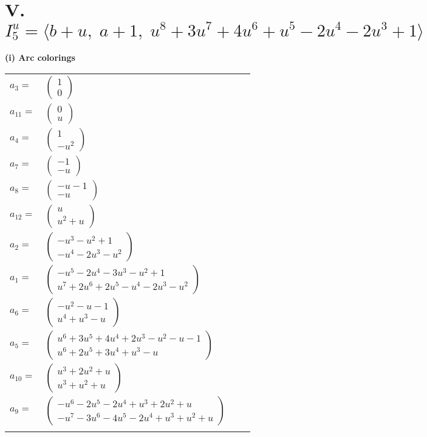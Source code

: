 \documentclass[1p]{elsarticle_modified}
\theoremstyle{definition}
\begin{document}
\centering \section*{V. $I^u_{5}= \langle b+u,\;a+1,\;u^8+3 u^7+4 u^6+u^5-2 u^4-2 u^3+1 \rangle$}
\flushleft \textbf{(i) Arc colorings}\\
\begin{tabular}{m{7pt} m{180pt} m{7pt} m{180pt} }
\flushright $a_{3}=$&$\begin{pmatrix}1\\0\end{pmatrix}$ \\
\flushright $a_{11}=$&$\begin{pmatrix}0\\u\end{pmatrix}$ \\
\flushright $a_{4}=$&$\begin{pmatrix}1\\- u^2\end{pmatrix}$ \\
\flushright $a_{7}=$&$\begin{pmatrix}-1\\- u\end{pmatrix}$ \\
\flushright $a_{8}=$&$\begin{pmatrix}- u-1\\- u\end{pmatrix}$ \\
\flushright $a_{12}=$&$\begin{pmatrix}u\\u^2+u\end{pmatrix}$ \\
\flushright $a_{2}=$&$\begin{pmatrix}- u^3- u^2+1\\- u^4-2 u^3- u^2\end{pmatrix}$ \\
\flushright $a_{1}=$&$\begin{pmatrix}- u^5-2 u^4-3 u^3- u^2+1\\u^7+2 u^6+2 u^5- u^4-2 u^3- u^2\end{pmatrix}$ \\
\flushright $a_{6}=$&$\begin{pmatrix}- u^2- u-1\\u^4+u^3- u\end{pmatrix}$ \\
\flushright $a_{5}=$&$\begin{pmatrix}u^6+3 u^5+4 u^4+2 u^3- u^2- u-1\\u^6+2 u^5+3 u^4+u^3- u\end{pmatrix}$ \\
\flushright $a_{10}=$&$\begin{pmatrix}u^3+2 u^2+u\\u^3+u^2+u\end{pmatrix}$ \\
\flushright $a_{9}=$&$\begin{pmatrix}- u^6-2 u^5-2 u^4+u^3+2 u^2+u\\- u^7-3 u^6-4 u^5-2 u^4+u^3+u^2+u\end{pmatrix}$\\&\end{tabular}
\end{document}
